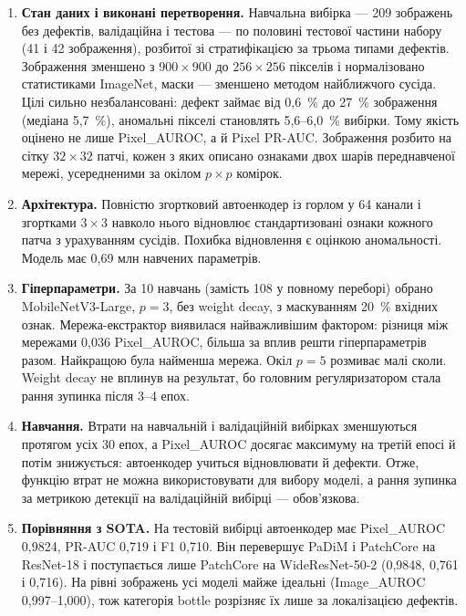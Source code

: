 \documentclass[14pt,a4paper]{extreport}
\begin{document}
\begin{enumerate}
\item \textbf{Стан даних і виконані перетворення.} Навчальна вибірка --- 209 зображень без дефектів, валідаційна і тестова --- по половині тестової частини набору (41 і 42 зображення), розбитої зі стратифікацією за трьома типами дефектів. Зображення зменшено з $900 \times 900$ до $256 \times 256$ пікселів і нормалізовано статистиками ImageNet, маски --- зменшено методом найближчого сусіда. Цілі сильно незбалансовані: дефект займає від 0,6~\% до 27~\% зображення (медіана 5,7~\%), аномальні пікселі становлять 5,6--6,0~\% вибірки. Тому якість оцінено не лише Pixel\_AUROC, а й Pixel PR-AUC. Зображення розбито на сітку $32 \times 32$ патчі, кожен з яких описано ознаками двох шарів переднавченої мережі, усередненими за окілом $p \times p$ комірок.

\item \textbf{Архітектура.} Повністю згортковий автоенкодер із горлом у 64 канали і згортками $3 \times 3$ навколо нього відновлює стандартизовані ознаки кожного патча з урахуванням сусідів. Похибка відновлення є оцінкою аномальності. Модель має 0,69 млн навчених параметрів.

\item \textbf{Гіперпараметри.} За 10 навчань (замість 108 у повному переборі) обрано MobileNetV3-Large, $p = 3$, без weight decay, з маскуванням 20~\% вхідних ознак. Мережа-екстрактор виявилася найважливішим фактором: різниця між мережами 0,036 Pixel\_AUROC, більша за вплив решти гіперпараметрів разом. Найкращою була найменша мережа. Окіл $p = 5$ розмиває малі сколи. Weight decay не вплинув на результат, бо головним регуляризатором стала рання зупинка після 3--4 епох.

\item \textbf{Навчання.} Втрати на навчальній і валідаційній вибірках зменшуються протягом усіх 30 епох, а Pixel\_AUROC досягає максимуму на третій епосі й потім знижується: автоенкодер учиться відновлювати й дефекти. Отже, функцію втрат не можна використовувати для вибору моделі, а рання зупинка за метрикою детекції на валідаційній вибірці --- обов'язкова.

\item \textbf{Порівняння з SOTA.} На тестовій вибірці автоенкодер має Pixel\_AUROC 0,9824, PR-AUC 0,719 і F1 0,710. Він перевершує PaDiM і PatchCore на ResNet-18 і поступається лише PatchCore на WideResNet-50-2 (0,9848, 0,761 і 0,716). На рівні зображень усі моделі майже ідеальні (Image\_AUROC 0,997--1,000), тож категорія bottle розрізняє їх лише за локалізацією дефектів.


\end{enumerate}
\end{document}

